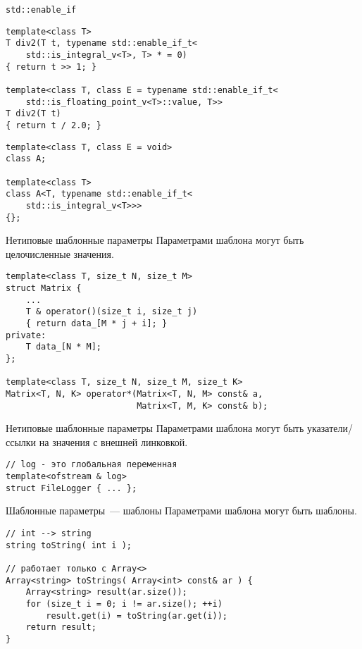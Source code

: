 \documentclass{beamer}
\begin{document}
\begin{frame}[fragile]{{\tt std::enable\_if}}
\begin{lstlisting}
template<class T>
T div2(T t, typename std::enable_if_t<
    std::is_integral_v<T>, T> * = 0)
{ return t >> 1; }

template<class T, class E = typename std::enable_if_t<
    std::is_floating_point_v<T>::value, T>>
T div2(T t) 
{ return t / 2.0; }
\end{lstlisting}

\begin{lstlisting}
template<class T, class E = void> 
class A; 
 
template<class T>
class A<T, typename std::enable_if_t<
    std::is_integral_v<T>>> 
{};
\end{lstlisting}
\end{frame}

\begin{frame}[fragile]{Нетиповые шаблонные параметры}
\small
Параметрами шаблона могут быть целочисленные значения.
    \begin{lstlisting}
template<class T, size_t N, size_t M>
struct Matrix {
    ...
    T & operator()(size_t i, size_t j) 
    { return data_[M * j + i]; }
private:
    T data_[N * M];
};

template<class T, size_t N, size_t M, size_t K>
Matrix<T, N, K> operator*(Matrix<T, N, M> const& a, 
                          Matrix<T, M, K> const& b);
    \end{lstlisting}
\end{frame}

\begin{frame}[fragile]{Нетиповые шаблонные параметры}
\small
Параметрами шаблона могут быть указатели/ссылки на значения с внешней линковкой.
    \begin{lstlisting}
// log - это глобальная переменная
template<ofstream & log>
struct FileLogger { ... };
    \end{lstlisting}
\end{frame}

\begin{frame}[fragile]{Шаблонные параметры~--- шаблоны}
Параметрами шаблона могут быть шаблоны.
\small
    \begin{lstlisting}
// int --> string
string toString( int i );

// работает только с Array<>
Array<string> toStrings( Array<int> const& ar ) {
    Array<string> result(ar.size());
    for (size_t i = 0; i != ar.size(); ++i)
        result.get(i) = toString(ar.get(i));
    return result;
}
    \end{lstlisting}
\end{frame}
\end{document}
